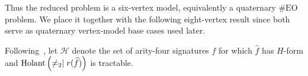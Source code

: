 Thus the reduced problem is a six-vertex model, equivalently a quaternary
$\#\mathrm{EO}$ problem.  We place it together with the following
eight-vertex result since both serve as quaternary vertex-model base
cases used later.

Following~\cite{HuangFu4Regular}, let $\mathscr H$ denote the set of
arity-four signatures $f$ for which $\widehat f$ has $H$-form and
$\operatorname{Holant}\left(\neq_2\mid r(\widehat f)\right)$ is tractable.

